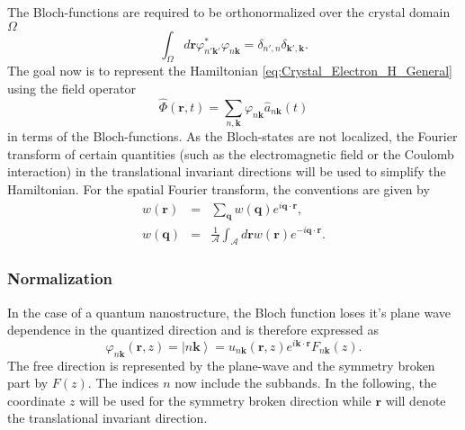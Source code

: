 The Bloch-functions are required to be orthonormalized over the crystal
domain $\Omega$\begin{equation}
\int_{\Omega}d\mathbf{r}\varphi_{n'\mathbf{k}'}^{*}\varphi_{n\mathbf{k}}=\delta_{n',n}\delta_{\mathbf{k}',\mathbf{k}}.\label{eq:Bloch_Orthonormality}\end{equation}
The goal now is to represent the Hamiltonian \ref{eq:Crystal_Electron_H_General}
using the field operator \begin{equation}
\hat{\Phi}(\mathbf{r},t)=\sum_{n,\mathbf{k}}\varphi_{n\mathbf{k}}\hat{a}_{n\mathbf{k}}(t)\end{equation}
in terms of the Bloch-functions. As the Bloch-states are not localized,
the Fourier transform of certain quantities (such as the electromagnetic
field or the Coulomb interaction) in the translational invariant directions
will be used to simplify the Hamiltonian. For the spatial Fourier
transform, the conventions are given by\begin{eqnarray}
w(\mathbf{r}) & = & \sum_{\mathbf{q}}w(\mathbf{q})e^{i\mathbf{q}\cdot\mathbf{r}},\label{eq:Fourier_Transform}\\
w(\mathbf{q}) & = & \frac{1}{\mathcal{A}}\int_{\mathcal{A}}d\mathbf{r}w(\mathbf{r})e^{-i\mathbf{q}\cdot\mathbf{r}}.\label{eq:Inverse_Fourier_Transform}\end{eqnarray}



\subsubsection{Normalization}

In the case of a quantum nanostructure, the Bloch function loses it\textquoteright{}s
plane wave dependence in the quantized direction and is therefore
expressed as\begin{equation}
\varphi_{n\mathbf{k}}(\mathbf{r},z)=\left|n\mathbf{k}\right\rangle =u_{n\mathbf{k}}(\mathbf{r},z)e^{i\mathbf{k}\cdot\mathbf{r}}F_{n\mathbf{k}}(z).\label{eq:Bloch_WF_Nanostructure}\end{equation}
The free direction is represented by the plane-wave and the symmetry
broken part by $F(z)$. The indices $n$ now include the subbands.
In the following, the coordinate $z$ will be used for the symmetry
broken direction while $\mathbf{r}$ will denote the translational
invariant direction. 

